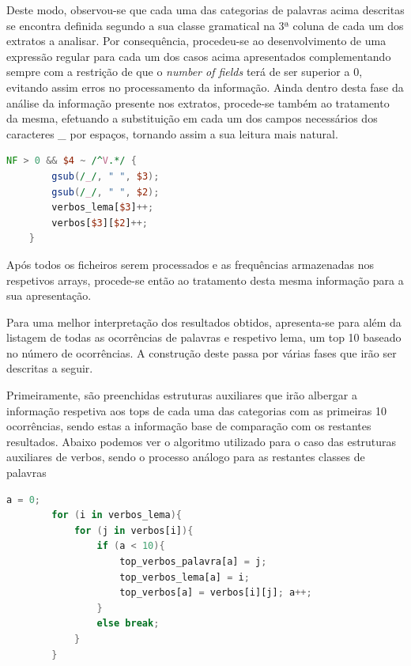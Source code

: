\documentclass[a4paper]{article}
\begin{document}
\par Deste modo, observou-se que cada uma das categorias de palavras acima descritas se encontra definida segundo a sua classe gramatical na 3ª coluna de cada um dos extratos a analisar. Por consequência, procedeu-se ao desenvolvimento de uma expressão regular para cada um dos casos acima apresentados complementando sempre com a restrição de que o \emph{number of fields} terá de ser superior a 0, evitando assim erros no processamento da informação. Ainda dentro desta fase da análise da informação presente nos extratos, procede-se também ao tratamento da mesma, efetuando a substituição em cada um dos campos necessários dos caracteres \emph{\_} por espaços, tornando assim a sua leitura mais natural.

\begin{lstlisting}[language=Awk, caption=Preenchimento das estruturas de dados com o número de ocorrências de lemas e palavras.]
	NF > 0 && $4 ~ /^V.*/ { 
        gsub(/_/, " ", $3);
        gsub(/_/, " ", $2);
        verbos_lema[$3]++;
        verbos[$3][$2]++;
    }
\end{lstlisting}

\par Após todos os ficheiros serem processados e as frequências armazenadas nos respetivos arrays, procede-se então ao tratamento desta mesma informação para a sua apresentação.

\par Para uma melhor interpretação dos resultados obtidos, apresenta-se para além da listagem de todas as ocorrências de palavras e respetivo lema, um top 10 baseado no número de ocorrências. A construção deste passa por várias fases que irão ser descritas a seguir.

\par Primeiramente, são preenchidas estruturas auxiliares que irão albergar a informação respetiva aos tops de cada uma das categorias com as primeiras 10 ocorrências, sendo estas a informação base de comparação com os restantes resultados. Abaixo podemos ver o algoritmo utilizado para o caso das estruturas auxiliares de verbos, sendo o processo análogo para as restantes classes de palavras

\begin{lstlisting}[language=Awk, caption=Preenchimento inicial das estruturas de dados dos tops.]
	a = 0;
        for (i in verbos_lema){
            for (j in verbos[i]){
                if (a < 10){
                    top_verbos_palavra[a] = j;
                    top_verbos_lema[a] = i;
                    top_verbos[a] = verbos[i][j]; a++;
                }
                else break;
            }
        }
\end{lstlisting}
\end{document}
